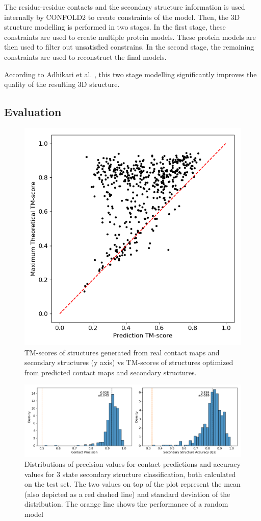 The residue-residue contacts and the secondary structure information is used internally by CONFOLD2 to create constraints of the model.
Then, the 3D structure modelling is performed in two stages.
In the first stage, these constraints are used to create multiple protein models.
These protein models are then used to filter out unsatisfied constrains.
In the second stage, the remaining constraints are used to reconstruct the final models.

According to Adhikari et al. \cite{confold}, this two stage modelling significantly improves the quality of the resulting 3D structure.

\subsection{Evaluation}

\begin{figure}
    \centering
    \includegraphics[width=0.6\linewidth]{imgs_tomas/test_tmscore.png}
    \caption{TM-scores of structures generated from real contact maps and secondary structures (y axis) vs TM-scores of structures optimized from predicted contact maps and secondary structures.}
    \label{fig:test_tmscore}
\end{figure}

\begin{figure}
    \centering
    \includegraphics[width=\linewidth]{imgs_tomas/contacts_secondary_eval.png}
    \caption{Distributions of precision values for contact predictions and accuracy values for 3 state secondary structure classification, both calculated on the test set. The two values on top of the plot represent the mean (also depicted as a red dashed line) and standard deviation of the distribution. The orange line shows the performance of a random model}
    \label{fig:contacts_sec}
\end{figure}

